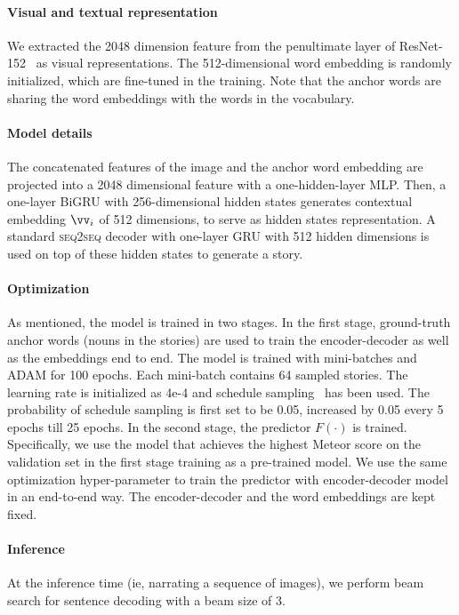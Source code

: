 \paragraph{Visual and textual representation} We extracted the 2048 dimension feature from the penultimate layer of ResNet-152~\cite{he2016deep} as visual representations. The 512-dimensional word embedding is randomly initialized, which are fine-tuned in the training. Note that the anchor words are sharing the word embeddings with the words in the vocabulary.

\vspace{-10pt}

\paragraph{Model details} The concatenated features of the image and the anchor word embedding are projected into a 2048 dimensional feature with a one-hidden-layer MLP. Then, a one-layer BiGRU with 256-dimensional hidden states generates contextual embedding $\vv_i$ of 512 dimensions, to serve as hidden states representation. A standard \textsc{seq2seq} decoder with one-layer GRU with 512 hidden dimensions is used on top of these hidden states to generate a story.

\vspace{-10pt}

\paragraph{Optimization} As mentioned, the model is trained in two stages. In the first stage, ground-truth anchor words (nouns in the stories) are used to train the encoder-decoder as well as the embeddings end to end. The model is trained with mini-batches and ADAM for 100 epochs. Each mini-batch contains 64 sampled stories. The learning rate is initialized as 4e-4 and schedule sampling~\cite{bengio2015scheduled} has been used. The probability of schedule sampling is first set to be 0.05, increased by 0.05 every 5 epochs till 25 epochs. In the second stage, the predictor $F(\cdot)$ is trained. Specifically, we use the model that achieves the highest Meteor score on the validation set in the first stage training as a pre-trained model. We use the same optimization hyper-parameter to train the predictor with encoder-decoder model in an end-to-end way. The encoder-decoder and the word embeddings are kept fixed.


\paragraph{Inference} At the inference time (ie, narrating a sequence of images), we perform beam search for sentence decoding with a beam size of 3.
